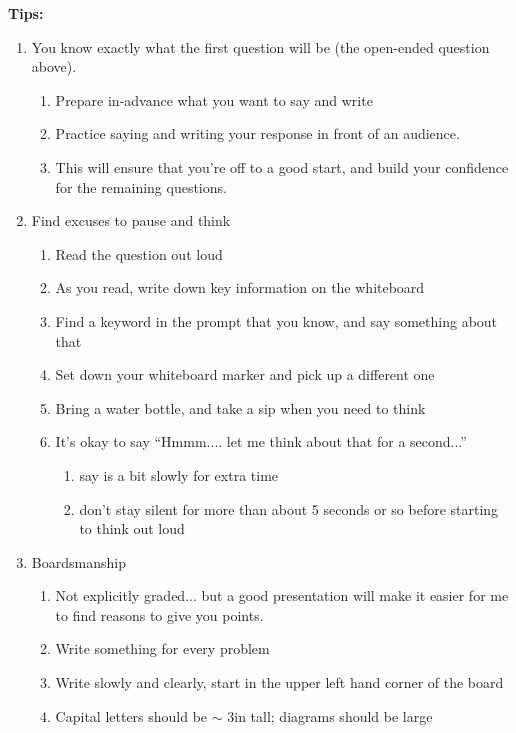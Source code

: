 \documentclass[10pt]{exam}
\theoremstyle{definition}
\begin{document}
\noindent
\textbf{Tips:}
\begin{enumerate}
    \item You know exactly what the first question will be
        (the open-ended question above).
        \begin{enumerate}
            \item Prepare in-advance what you want to say and write
            \item Practice saying and writing your response in front of an audience.
            \item This will ensure that you're off to a good start, and build your confidence for the remaining questions.
        \end{enumerate}
    \item Find excuses to pause and think
        \begin{enumerate}
            \item Read the question out loud
            \item As you read, write down key information on the whiteboard
            \item Find a keyword in the prompt that you know, and say something about that
            \item Set down your whiteboard marker and pick up a different one
            \item Bring a water bottle, and take a sip when you need to think
            \item It's okay to say ``Hmmm.... let me think about that for a second...''
                \begin{enumerate}
                    \item say is a bit slowly for extra time
                    \item don't stay silent for more than about 5 seconds or so before starting to think out loud
                \end{enumerate}
        \end{enumerate}
    \item Boardsmanship
            \begin{enumerate}
                \item Not explicitly graded... but a good presentation will make it easier for me to find reasons to give you points.
                \item Write something for every problem
                \item Write slowly and clearly, start in the upper left hand corner of the board
                \item Capital letters should be $\sim$ 3in tall; diagrams should be large

\end{enumerate}
\end{enumerate}
\end{document}
